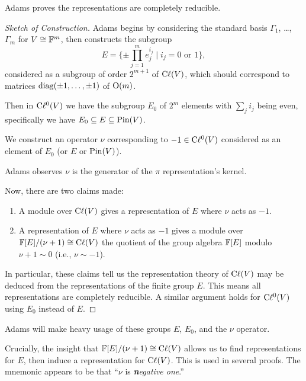 Adams proves the representations are completely reducible.

\begin{proof}[Sketch of Construction]
Adams begins by considering the standard basis $\Gamma_{1}$, \dots, $\Gamma_{m}$
for $V\cong\mathbb{F}^{m}$, then constructs the subgroup
\begin{equation}
E = \{\pm\prod^{m}_{j=1}e^{i_{j}}_{j} \mid i_{j}=0\mbox{ or }1\},
\end{equation}
considered as a subgroup of order $2^{m+1}$ of $\mathrm{C}\ell(V)$, which should
correspond to matrices $\operatorname{diag}(\pm1,\dots,\pm1)$ of $\mathrm{O}(m)$.

Then in $\mathrm{C}\ell^{0}(V)$ we have the subgroup $E_{0}$ of $2^{m}$ elements
with $\sum_{j}i_{j}$ being even, specifically we have $E_{0}\subseteq E\subseteq\operatorname{Pin}(V)$.

We construct an operator $\nu$ corresponding to $-1\in\mathrm{C}\ell^{0}(V)$
considered as an element of $E_{0}$ (or $E$ or $\operatorname{Pin}(V)$).

Adams observes $\nu$ is the generator of the $\pi$ representation's kernel.

Now, there are two claims made:
\begin{enumerate}
\item A module over $\mathrm{C}\ell(V)$ gives a representation of $E$ where $\nu$
  acts as $-1$.
\item A representation of $E$ where $\nu$ acts as $-1$ gives a module
  over $\mathbb{F}[E]/(\nu+1)\cong\mathrm{C}\ell(V)$ the quotient of the group algebra
  $\mathbb{F}[E]$ modulo $\nu+1\sim0$ (i.e., $\nu\sim-1$).
\end{enumerate}
In particular, these claims tell us the representation theory of
$\mathrm{C}\ell(V)$ may be deduced from the representations of the finite group $E$.
This means all representations are completely reducible. A similar
argument holds for $\mathrm{C}\ell^{0}(V)$ using $E_{0}$ instead of $E$.
\end{proof}

\begin{remark}
Adams will make heavy usage of these groups $E$, $E_{0}$, and the $\nu$ operator.
\end{remark}

\begin{remark}
Crucially, the insight that $\mathbb{F}[E]/(\nu+1)\cong\mathrm{C}\ell(V)$ allows us to find
representations for $E$, then induce a representation for $\mathrm{C}\ell(V)$. This
is used in several proofs. The mnemonic appears to be that ``$\nu$ is
\emph{\textbf{n}egative one}.''
\end{remark}

